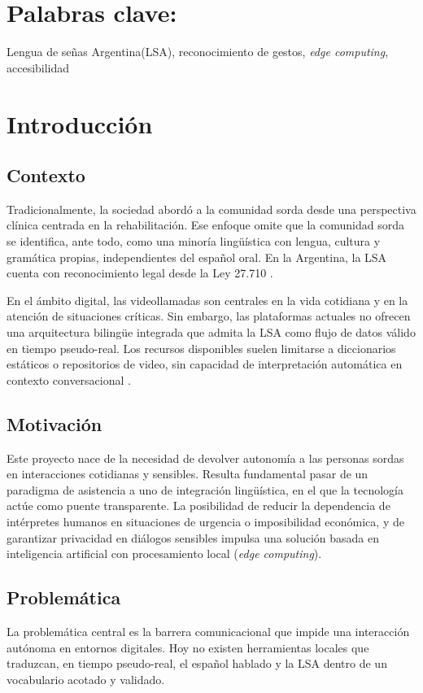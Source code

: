 \documentclass[12pt,a4paper]{report}
\begin{document}
\chapter*{Palabras clave:}
Lengua de señas Argentina(LSA), reconocimiento de gestos, \textit{edge computing}, accesibilidad

\chapter{Introducción}
\section{Contexto}
Tradicionalmente, la sociedad abordó a la comunidad sorda desde una perspectiva clínica centrada en la rehabilitación. Ese enfoque omite que la comunidad sorda se identifica, ante todo, como una minoría lingüística con lengua, cultura y gramática propias, independientes del español oral. En la Argentina, la LSA cuenta con reconocimiento legal desde la Ley 27.710 \parencite{argentina2020ley27710}.

En el ámbito digital, las videollamadas son centrales en la vida cotidiana y en la atención de situaciones críticas. Sin embargo, las plataformas actuales no ofrecen una arquitectura bilingüe integrada que admita la LSA como flujo de datos válido en tiempo pseudo-real. Los recursos disponibles suelen limitarse a diccionarios estáticos o repositorios de video, sin capacidad de interpretación automática en contexto conversacional \parencite{inju2024diccionario}.

\section{Motivación}
Este proyecto nace de la necesidad de devolver autonomía a las personas sordas en interacciones cotidianas y sensibles. Resulta fundamental pasar de un paradigma de asistencia a uno de integración lingüística, en el que la tecnología actúe como puente transparente. La posibilidad de reducir la dependencia de intérpretes humanos en situaciones de urgencia o imposibilidad económica, y de garantizar privacidad en diálogos sensibles impulsa una solución basada en inteligencia artificial con procesamiento local (\textit{edge computing}).

\section{Problemática}
La problemática central es la barrera comunicacional que impide una interacción autónoma en entornos digitales. Hoy no existen herramientas locales que traduzcan, en tiempo pseudo-real, el español hablado y la LSA dentro de un vocabulario acotado y validado.
\end{document}

